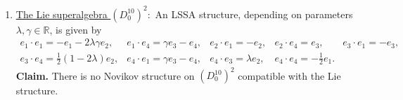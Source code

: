 \documentclass[12pt]{amsart}
\begin{document}
\begin{enumerate}
\begin{proof}
\[\]
Let us put
\[
\begin{array}{lcl}
N(x,y,z): & = & (z\cdot x) \cdot y - (-1)^{|x||y|} (z\cdot y) \cdot x,\\[3mm]
T(x,y,z) : & = & (x,y,z)- (-1)^{|x||y|} (y,x,z).
\end{array}
\]
A direct calculation gives
\[
N(e_4, e_4, e_4)=0 \implies \lambda^3_{14}=\lambda_{14}^4=0, \text{ also } N(e_4, e_1, e_4)=0 \implies \lambda^1_{11}=\lambda_{11}^2=0.
\]
Similarly, 
\[
N(e_1, e_3, e_1)=0 \implies \lambda^3_{31}=\lambda_{13}^4=0, \text{ also } T(e_2, e_1, e_2)=0 \implies \lambda^2_{21}=\lambda_{12}^1=\lambda^1_{22}=\lambda_{22}^2=0.
\]
Additionally, 
\[
N(e_4, e_2, e_1)=0 \implies \lambda^4_{24}=\lambda_{42}^3=-1 \text{ also } N(e_4, e_2, e_4)=0 \implies \lambda^1_{34}=\lambda_{43}^2=0.
\]
Now, $N(e_3, e_4, e_4)=\frac{1}{2}e_3$ which is a not zero. Therefore, it cannot be Novikov.   
\end{proof}
However, there is a Balinsky-Novikov structure, depending on parameters $\lambda, \gamma \in \mathbb R$, is given by
 \[
 \begin{array}{llll}
e_1 \cdot e_1= \gamma e_1+\lambda e_2, & e_1\cdot e_2= (1+\gamma) e_2, & e_1\cdot e_3=\frac{1}{2} (2+\gamma)e_3, & e_1\cdot e_4= -\lambda e_3+\frac{\gamma}{2}e_4,\\[2mm]
e_2\cdot e_1=\gamma e_2, & e_2\cdot e_4= -\gamma e_3, & e_3\cdot e_1= \gamma e_3, &  e_3\cdot e_4= -\frac{1}{2} e_2,\\[2mm]
e_4\cdot e_1=-2 \lambda e_3+\gamma e_4, & e_4\cdot e_2=-2(1+\gamma)e_3& e_4\cdot e_3=-\frac{1}{2}e_2, & e_4\cdot e_4=e_1.
 \end{array}
 \]
    \item \underline{The Lie superalgebra $(D^{10}_{0})^2:$} An LSSA structure, depending on parameters $\lambda, \gamma \in \mathbb R$, is given by
    \[
\begin{array}{lllll}
e_1\cdot e_1=- e_1 -2 \lambda \gamma e_2, &  e_1\cdot e_4= \gamma e_3-e_4, & e_2\cdot e_1= - e_2, & e_2\cdot e_4= e_3, & e_3\cdot e_1=- e_3,\\[2mm]
e_3 \cdot e_4= \frac{1}{2} (1-2 \lambda)e_2, & e_4\cdot e_1= \gamma e_3- e_4, & e_4\cdot e_3=\lambda e_2, & e_4\cdot e_4=-\frac{1}{2} e_1.
\end{array}
 \]
{\bf Claim.} There is no Novikov structure on $(D^{10}_{0})^2$ compatible with the Lie structure. 


\end{enumerate}
\end{document}
